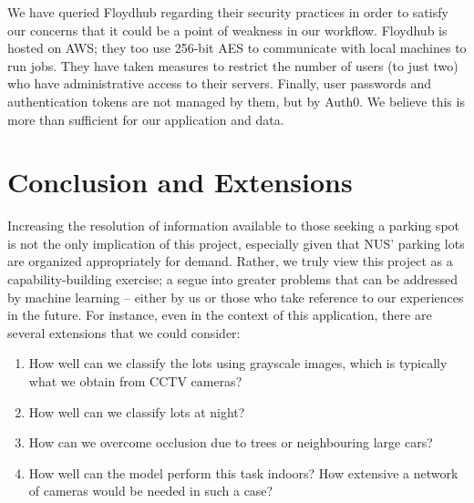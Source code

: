 \documentclass[]{article}
\providecommand{\tightlist}{%
  \setlength{\itemsep}{0pt}\setlength{\parskip}{0pt}}
\begin{document}
We have queried Floydhub regarding their security practices in order to satisfy
our concerns that it could be a point of weakness in our workflow.  Floydhub is
hosted on AWS; they too use 256-bit AES to communicate with local machines to
run jobs. They have taken measures to restrict the number of users (to just
two) who have administrative access to their servers. Finally, user passwords
and authentication tokens are not managed by them, but by Auth0. We believe
this is more than sufficient for our application and data.

%

\section{Conclusion and Extensions}\label{conclusion}

Increasing the resolution of information available to those seeking a
parking spot is not the only implication of this project, especially
given that NUS' parking lots are organized appropriately for demand.
Rather, we truly view this project as a capability-building exercise; a segue
into greater problems that can be addressed by machine learning --
either by us or those who take reference to our experiences in the
future. For instance, even in the context of this application, there are
several extensions that we could consider:
\begin{enumerate}
\tightlist
\item How well can we classify the lots using grayscale images, which is
typically what we obtain from CCTV cameras?
\item How well can we classify lots at night?
\item How can we overcome occlusion due to trees or neighbouring large cars?
\item How well can the model perform this task indoors? How extensive a network
of cameras would be needed in such a case?
\end{enumerate}



\end{document}
